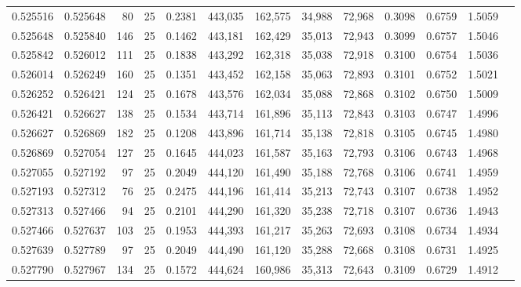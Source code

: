 \begin{tabular}{rrrrrrrrrrrrr}
0.525516 & 0.525648 &    80 &  25 &                                     0.2381 & 443,035 & 162,575 &  34,988 &  72,968 & 0.3098 & 0.6759 & 1.5059 \\
0.525648 & 0.525840 &   146 &  25 &                                     0.1462 & 443,181 & 162,429 &  35,013 &  72,943 & 0.3099 & 0.6757 & 1.5046 \\
0.525842 & 0.526012 &   111 &  25 &                                     0.1838 & 443,292 & 162,318 &  35,038 &  72,918 & 0.3100 & 0.6754 & 1.5036 \\
0.526014 & 0.526249 &   160 &  25 &                                     0.1351 & 443,452 & 162,158 &  35,063 &  72,893 & 0.3101 & 0.6752 & 1.5021 \\
0.526252 & 0.526421 &   124 &  25 &                                     0.1678 & 443,576 & 162,034 &  35,088 &  72,868 & 0.3102 & 0.6750 & 1.5009 \\
0.526421 & 0.526627 &   138 &  25 &                                     0.1534 & 443,714 & 161,896 &  35,113 &  72,843 & 0.3103 & 0.6747 & 1.4996 \\
0.526627 & 0.526869 &   182 &  25 &                                     0.1208 & 443,896 & 161,714 &  35,138 &  72,818 & 0.3105 & 0.6745 & 1.4980 \\
0.526869 & 0.527054 &   127 &  25 &                                     0.1645 & 444,023 & 161,587 &  35,163 &  72,793 & 0.3106 & 0.6743 & 1.4968 \\
0.527055 & 0.527192 &    97 &  25 &                                     0.2049 & 444,120 & 161,490 &  35,188 &  72,768 & 0.3106 & 0.6741 & 1.4959 \\
0.527193 & 0.527312 &    76 &  25 &                                     0.2475 & 444,196 & 161,414 &  35,213 &  72,743 & 0.3107 & 0.6738 & 1.4952 \\
0.527313 & 0.527466 &    94 &  25 &                                     0.2101 & 444,290 & 161,320 &  35,238 &  72,718 & 0.3107 & 0.6736 & 1.4943 \\
0.527466 & 0.527637 &   103 &  25 &                                     0.1953 & 444,393 & 161,217 &  35,263 &  72,693 & 0.3108 & 0.6734 & 1.4934 \\
0.527639 & 0.527789 &    97 &  25 &                                     0.2049 & 444,490 & 161,120 &  35,288 &  72,668 & 0.3108 & 0.6731 & 1.4925 \\
0.527790 & 0.527967 &   134 &  25 &                                     0.1572 & 444,624 & 160,986 &  35,313 &  72,643 & 0.3109 & 0.6729 & 1.4912 \\

\end{tabular}
